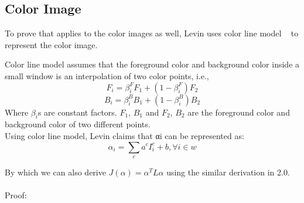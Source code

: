 \documentclass[11pt,letterpaper]{article}
\begin{document}
\subsection{Color Image}

To prove that applies to the color images as well, Levin uses color line model ~\cite{Omer:2004} to represent the color image. 

Color line model assumes that the foreground color and background color inside a small window is an interpolation of two color points, i.e.,
$$F_i = \beta^F_{i} F_1 + (1-\beta^F_{i})F_2$$
$$B_i = \beta^B_{i} B_1 + (1-\beta^B_{i})B_2$$
Where $\beta_i$s are constant factors. $F_1$, $B_1$ and $F_2$, $B_2$ are the foreground color and background color of two different points.\\

Using color line model, Levin claims that αi can be represented as:
$$\alpha_i = \sum_{c}a^cI_i^c + b, \forall i \in w$$

By which we can also derive $J(\alpha) = \alpha^T L \alpha$ using the similar derivation in 2.0. \\\\

Proof:\\
\end{document}
